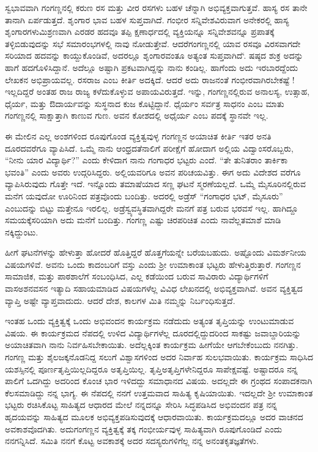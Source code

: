 {ಸ್ವಭಾವವಾಗಿ ಗಂಗಣ್ಣನಲ್ಲಿ ಕರುಣ ರಸ ಮತ್ತು ವೀರ ರಸಗಳು ಬಹಳ ಚೆನ್ನಾಗಿ ಅಭಿವ್ಯಕ್ತವಾಗುತ್ತವೆ. ಹಾಸ್ಯ ರಸ ತಾನೇ ತಾನಾಗಿ ಏರ್ಪಡುತ್ತದೆ. ಶೃಂಗಾರ ಭಾವ ಬಹಳ ಸುಪ್ತವಾಗಿದೆ. ಗಂಭೀರ ಸನ್ನಿವೇಶವಿರುವಾಗ ಅನೇಕರಲ್ಲಿ ಹಾಸ್ಯ ಶೃಂಗಾರಗಳು\break ಮಿಶ್ರಣವಾಗಿ ಎರಡರ ಹದವೂ ತಪ್ಪಿ ಕ್ಷಣಾರ್ಧದಲ್ಲಿ ವ್ಯಕ್ತಿಯನ್ನೂ ಸನ್ನಿವೇಶವನ್ನೂ ಪ್ರಪಾತಕ್ಕೆ ತಳ್ಳಿಬಿಡುವುದನ್ನು  ಸಭೆ ಸಮಾರಂಭಗಳಲ್ಲಿ ನಾವು ನೋಡುತ್ತೇವೆ. ಆದರೆ\break ಗಂಗಣ್ಣನಲ್ಲಿ ಯಾವ ರಸವೂ ವಿರಸವಾಗದೇ ಸರಿಯಾದ ಹದವನ್ನು ಕಾಯ್ದು\-ಕೊಂಡಿವೆ, ಅದರಲ್ಲೂ ಶೃಂಗಾರವಂತೂ ಅತ್ಯಂತ ಸುಪ್ತವಾಗಿದೆ‘. ಷಷ್ಠದ ಶುಕ್ರ ಅದನ್ನು ಹಾಗೆ ಹದಗೊಳಿಸಿದ್ದಾನೆ.  ಅದೆಲ್ಲೂ ಅಷ್ಟಾಗಿ ಪ್ರಕಟವಾಗಿದ್ದನ್ನು ನಾನು ಕಂಡಿಲ್ಲ. ಹಾಗೆಂದು ಅದು ಇರಬಾರದ್ದೆಂದು ಲೇಖಕನ ಅಭಿಪ್ರಾಯವಲ್ಲ. ರಸರಾಜ ಎಂಬ ಕೀರ್ತಿ ಅದಕ್ಕಿದೆ. ಆದರೆ ಅದು ರಾಜನಂತೆ ಗಂಭೀರವಾಗಿರಬೇಕಷ್ಟೆ ! ಇಲ್ಲದಿದ್ದರೆ ಅಂತಹ ರಾಜ ರಾಜ್ಯ ಕಳೆದು\-ಕೊಳ್ಳುವ ಅಪಾಯವಿರುತ್ತದೆ. ಇನ್ನು, ಗಂಗಣ್ಣನಲ್ಲಿರುವ ಅನಾಲಸ್ಯ, ಉತ್ಸಾಹ, ಧೈರ್ಯ, ಮತ್ತು ಔದಾರ್ಯವನ್ನು ಸುಸ್ಥನಾದ ಕುಜ ಕೊಟ್ಟಿದ್ದಾನೆ. ಧೈರ್ಯಂ ಸರ್ವತ್ರ ಸಾಧನಂ ಎಂಬ ಮಾತು ಗಂಗಣ್ಣನಲ್ಲಿ ಸಾಕ್ಷಾತ್ತಾಗಿ ಕಾಣುವ ಗುಣ. ಅವನ ಕೋಶದಲ್ಲಿ ಅಧೈರ್ಯ ಎಂಬ ಪದಕ್ಕೆ ಸ್ಥಾನವೇ ಇಲ್ಲ. 

ಈ ಮೇಲಿನ ಎಲ್ಲ ಅಂಶಗಳಿಂದ ರೂಪುಗೊಂಡ ವ್ಯಕ್ತಿತ್ವವುಳ್ಳ ಗಂಗಣ್ಣನ ಅಯಾಚಿತ ಕೀರ್ತಿ ಇತರ ಅನತಿ ದೂರದವರೆಗೂ ವ್ಯಾಪಿಸಿದೆ. ಒಮ್ಮೆ ನಾನು ಆಂಧ್ರದ\break ತೆನಾಲಿಗೆ ಪರೀಕ್ಷೆಗೆ ಹೋದಾಗ ಅಲ್ಲಿಯ ವಿದ್ವಾಂಸರೊಬ್ಬರು, “ನೀನು ಯಾರ ವಿದ್ಯಾರ್ಥಿ?” ಎಂದು ಕೇಳಿದಾಗ ನಾನು ಗಂಗಾಧರ ಭಟ್ಟರು ಎಂದೆ. “ತೇ ತು\break ನಿತರಾಂ ತಾರ್ಕಿಕಾ ಭವಂತಿ” ಎಂದು ಅವರು ಉದ್ಗರಿಸಿದ್ದರು. ಅಲ್ಲಿಯವರಿಗೂ ಅವನ ಪರಿಚಯವಿತ್ತು. ಈಗ ಅದು ವಿದೇಶದ ವರೆಗೂ ವ್ಯಾಪಿಸಿರುವುದು ಗೊತ್ತೇ ಇದೆ.  ಇನ್ನೊಂದು ತಮಾಷೆಯಾದ ಸಣ್ಣ ಘಟನೆ ಸ್ಮರಣೆಯಲ್ಲದೆ. ಒಮ್ಮೆ ಮೈಸೂರಿನಲ್ಲಿರುವ ಮನೆಗ ಯವುದೋ ಊರಿನಿಂದ ಪತ್ರವೊಂದು ಬಂದಿತ್ತು. ಅದರಲ್ಲಿ ಅಡ್ರೆಸ್ \enginline{-}\break “ಗಂಗಾಧರ ಭಟ್, ಮೈಸೂರು” ಎಂಬುದನ್ನು ಬಿಟ್ಟು ಮತ್ತೇನೂ ಇರಲಿಲ್ಲ.  ಅಡ್ರೆಸ್\break ವ್ಯವಸ್ಥಿತವಾಗಿದ್ದರೇ ಮನಗೆ ಪತ್ರ ಬರುವ ಭರವಸೆ ಇಲ್ಲ. ಹಾಗಿದ್ದೂ ಸಮಯಕ್ಕೆ\break ಸರಿಯಾಗಿ ಅದು ಮನೆಗೆ ಬಂದಿತ್ತು. ಗಂಗಣ್ಣ ಎಷ್ಟು ಚಿರಪರಿಚಿತ ಎಂದು ನಾವೆಲ್ಲ\break ತಮಾಶೆ ಮಾಡಿ ನಕ್ಕಿದ್ದುಂಟು. 

ಹೀಗೆ ಘಟನೆಗಳನ್ನು ಹೇಳುತ್ತಾ ಹೋದರೆ ಹೊತ್ತಿದ್ದರೆ ಹೊತ್ತಗೆಯನ್ನೇ ಬರೆಯ\-ಬಹುದು. ಅಷ್ಟೊಂದು ವಿಮರ್ಶನೀಯ ವಿಷಯಗಳಿವೆ. ಅವನು ಒಂದು \hbox{ಕಾದಂಬರಿಗೆ} ವಸ್ತು ಎಂದು ಶ್ರೀ ಉಮಾಕಾಂತ ಭಟ್ಟರು ಹೇಳುತ್ತಿರುತ್ತಾರೆ. ಗಂಗಣ್ಣನ ಸಾಮಾಜಿಕ, ಮತ್ತು ಪಾಠಶಾಲೆಗೆ ಸಂಬಂಧಿಸಿದ, ಎಲ್ಲ ಕಡೆಯಿಂದ ಬರುವ ಸಾವಿರಾರು ವಿದ್ಯಾರ್ಥಿ\-ಗಳಿಗೆ ವಾಸ\enginline{-}ಅಶನ\enginline{-}ವಸನ ಇತ್ಯಾದಿ ಸಹಾಯಮಾಡಿದ ವಿಷಯಗಳೆಲ್ಲ ವಿವಿಧ ಲೇಖನದಲ್ಲಿ ಅಭಿವ್ಯಕ್ತವಾಗಿವೆ. ಅವನ ವ್ಯಕ್ತಿತ್ವದ ವ್ಯಾಪ್ತಿ ಅಷ್ಟೇ ವ್ಯಾಪ್ತವಾದುದು. ಆದರೆ ದೇಶ, ಕಾಲಗಳ ಮಿತಿ ನಮ್ಮನ್ನು ನಿರ್ಬಂಧಿಸುತ್ತದೆ. 

ಇಂತಹ ಒಂದು ವ್ಯಕ್ತಿತ್ವಕ್ಕೆ ಒಂದು ಅಭಿವಂದನ ಕಾರ್ಯಕ್ರಮ ನಡೆದುದು ಅತ್ಯಂತ ತೃಪ್ತಿಯನ್ನು ಉಂಟುಮಾಡುವ ವಿಷಯ. ಈ ಕಾರ್ಯಕ್ರಮದ ನೆಪದಲ್ಲಿ ಉಳಿದ ವಿದ್ಯಾರ್ಥಿ\-ಗಳೆಲ್ಲ ದೂರದಲ್ಲಿದ್ದುದರಿಂದ ಸಾಕಷ್ಟು ಜವಾಬ್ದಾರಿಯನ್ನು ಅಯಾಚಿತ\-ವಾಗಿ ನಾನು ನಿರ್ವಹಿಸಬೇಕಾಯಿತು. ಅದೆಲ್ಲಕ್ಕಿಂತ ಕಾರ್ಯಕ್ರಮ ಹೀಗೆಯೇ ಆಗ\-ಬೇಕೆಂಬುದು ನನಗಿತ್ತು. ಗಂಗಣ್ಣ ಮತ್ತು ಶೈಲಜಕ್ಕನೊಡನಿದ್ದ ಸಲುಗೆ ವಿಶ್ವಾಸಗಳಿಂದ ಅದರ ನಿರ್ವಾಹ ಸುಲಭವಾಯಿತು. ಕಾರ್ಯಕ್ರಮ ಸಾಧಿಸಿದ ಯಶಸ್ಸಿನಲ್ಲಿ ಪೂರ್ಣ\break ತೃಪ್ತಿಯಿಲ್ಲದಿದ್ದರೂ  ಅತೃಪ್ತಿಯಿಲ್ಲ. ತೃಪ್ತಿ\enginline{-}ಅತೃಪ್ತಿಗಳೇನಿದ್ದರೂ ಸಾಪೇಕ್ಷವಷ್ಟೆ. ಅಷ್ಟಾದರೂ ನನ್ನ ಪಾಲಿಗೆ ಒದಗಿದ್ದು ಅದರಿಂದ ಕೊಂಚ ಭಾರ ಇಳಿದದ್ದು ಸಮಾಧಾನದ ವಿಷಯ. ಅದಲ್ಲದೇ ಈ ಗ್ರಂಥದ ಸಂಪಾದಕನಾಗಿ ಕೆಲಸಮಾಡಿದ್ದು ನನ್ನ ಭಾಗ್ಯ. ಈ ನೆಪದಲ್ಲಿ ನನಗೆ ಉತ್ತಮವಾದ ಸಾಹಿತ್ಯ ಕೃಷಿಯಾಯಿತು. ಇದಲ್ಲದೇ ಶ್ರೀ ಉಮಾಕಾಂತ ಭಟ್ಟರು ರಚಿಸಿಕೊಟ್ಟ  ಸಾಹಿತ್ಯದ ಆಧಾರದ ಮೇಲೆ ನನ್ನದನ್ನೂ ಸೇರಿಸಿ ಸಿದ್ಧ\-ಪಡಿಸಿದ ಅಭಿವಂದನ ಪತ್ರ ನನ್ನ ಹೃದಯವನ್ನು ಸಾಹಿತ್ಯದ ಮೂಲಕ ಅಭಿವ್ಯಕ್ತಪಡಿಸುವುದಕ್ಕೆ ಆಧಾರವಾಯಿತು. ಕಾರ್ಯಕ್ರಮದಲ್ಲೂ ಅದರ ವಾಚನದ ಅವಕಾಶವೊದಗಿತು. ಅದು\break ಗಂಗಣ್ಣನ ವ್ಯಕ್ತಿತ್ವಕ್ಕೆ ತಕ್ಕ ಗಂಭೀರ್ಯವುಳ್ಳ ಸಾಹಿತ್ಯವಾಗಿ ರೂಪುಗೊಂಡಿದೆ ಎಂದು ನನಗನ್ನಿಸಿದೆ. ಸಮಿತಿ  ನನಗೆ ಕೊಟ್ಟ ಅವಕಾಶಕ್ಕೆ ಅದರ ಸದಸ್ಯರುಗಳಿಗೆಲ್ಲ ನನ್ನ ಅನಂತ\break ಕೃತಜ್ಞತೆಗಳು. 

}
